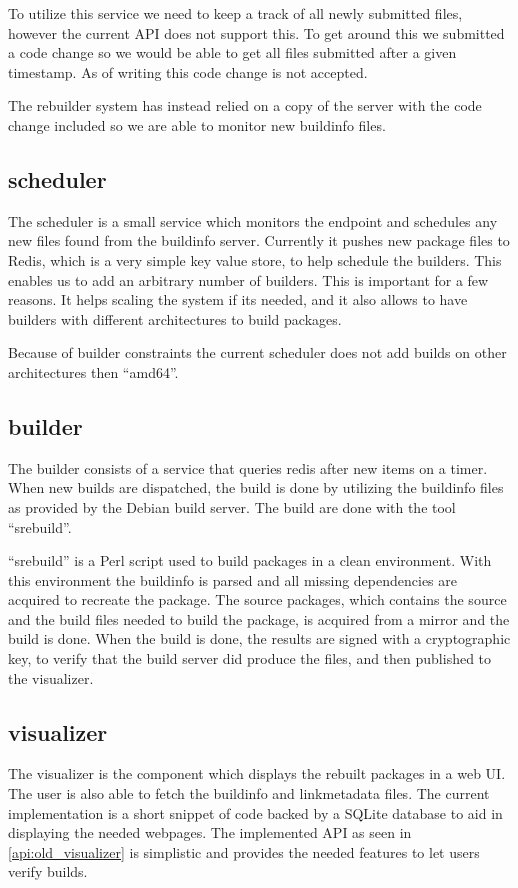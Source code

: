 \documentclass[../Main/thesis.tex]{subfiles}
\begin{document}
To utilize this service we need to keep a track of all newly submitted files,
however the current API does not support this. To get around this we submitted a
code change so we would be able to get all files submitted after a given
timestamp. As of writing this code change is not accepted.

The rebuilder system has instead relied on a copy of the server with the code
change included so we are able to monitor new buildinfo files.

\subsection{scheduler}%
\label{sub:scheduler}
The scheduler is a small service which monitors the endpoint and schedules any
new files found from the buildinfo server. Currently it pushes new package files
to Redis, which is a very simple key value store, to help schedule the builders.
This enables us to add an arbitrary number of builders. This is important for a
few reasons. It helps scaling the system if its needed, and it also allows to
have builders with different architectures to build packages.

Because of builder constraints the current scheduler does not add builds on
other architectures then ``amd64''.

\subsection{builder}%
\label{sub:builder}
The builder consists of a service that queries redis after new items on a timer.
When new builds are dispatched, the build is done by utilizing the buildinfo
files as provided by the Debian build server. The build are done with the tool
``srebuild''.

``srebuild'' is a Perl script used to build packages in a clean environment.
With this environment the buildinfo is parsed and all missing dependencies are
acquired to recreate the package. The source packages, which contains the source
and the build files needed to build the package, is acquired from a mirror and
the build is done. When the build is done, the results are signed with a
cryptographic key, to verify that the build server did produce the files, and
then published to the visualizer.


\subsection{visualizer}%
\label{sub:visualizer}
The visualizer is the component which displays the rebuilt packages in a web UI.
The user is also able to fetch the buildinfo and linkmetadata files. The current
implementation is a short snippet of code backed by a SQLite database to aid in
displaying the needed webpages. The implemented API as seen in
\ref{api:old_visualizer} is simplistic and provides the needed features to let
users verify builds.
\end{document}
